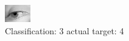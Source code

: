 \begin{figure}[h!]
\begin{center}
\includegraphics[width=0.60\columnwidth]{figures/ID2985_class_3_target_4.png}
\end{center}
\caption{ Classification: 3 actual target: 4}
\label{fig:ID2985_class_3_target_4}
\end{figure}
